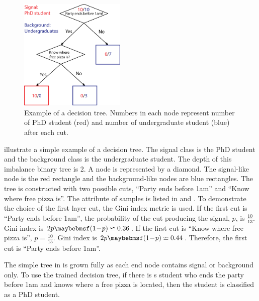 \begin{figure}[!tbp]
\includegraphics[width=0.45\textwidth]{doubleHiggs/mva/BDTcomic}
\caption[Example of a decision tree. ]
{Example of a decision tree. Numbers in each node represent number of PhD student (red) and number of undergraduate student (blue) after each cut.}
   \label{fig:doubleHiggsMVAdecisionTree}
\end{figure}

 illustrate a simple example of a decision tree. The signal class is the PhD student and the background class is the undergraduate student. The depth of this imbalance binary  tree is 2. A node is represented by a diamond.  The signal-like node is the red rectangle and the background-like nodes are blue rectangles. The tree is constructed with two possible cuts, ``Party ends before 1am'' and ``Know where free pizza is''. The attribute of samples is listed in  and  . To demonstrate the choice of the first layer cut, the Gini index metric is used. If the first cut is ``Party ends before 1am'', the probability of the cut producing the signal, $p$, is $\frac{10}{13}$. Gini index is $2p\parenths{1\!-\!p} \backsimeq 0.36 $. If the first cut is ``Know where free pizza is'', $p=\frac{10}{15}$. Gini index is $2p\parenths{1\!-\!p} \backsimeq 0.44 $. Therefore, the first cut is ``Party ends before 1am''.

The simple tree in  is grown fully as each end node contains signal or background only. To use the trained decision tree, if there is s student who ends the party before 1am and knows where a free pizza is located, then the student is classified as a PhD student.

